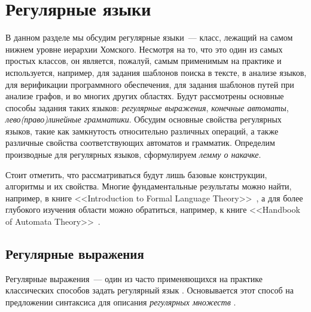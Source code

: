 \setchapterpreamble[u]{\margintoc}
\chapter{Регулярные языки}

В данном разделе мы обсудим регулярные языки~--- класс, лежащий на самом нижнем уровне иерархии Хомского.
Несмотря на то, что это один из самых простых классов, он является, пожалуй, самым применимым на практике и используется, например, для задания шаблонов поиска в тексте, в анализе языков, для верификации программного обеспечения, для задания шаблонов путей при анализе графов, и во многих других областях.
Будут рассмотрены основные способы задания таких языков: \emph{регулярные выражения}, \emph{конечные автоматы}, \emph{лево(право)линейные грамматики}.
Обсудим основные свойства регулярных языков, такие как замкнутость относительно различных операций, а также различные свойства соответствующих автоматов и грамматик.
Определим производные для регулярных языков, сформулируем \emph{лемму о накачке}.

Стоит отметить, что рассматриваться будут лишь базовые конструкции, алгоритмы и их свойства.
Многие фундаментальные результаты можно найти, например, в книге <<Introduction to Formal Language Theory>>~\cite{10.5555/578595}, а для более глубокого изучения области можно обратиться, например, к книге <<Handbook of Automata Theory>>~\cite{DBLP:books/ems/21/P2021}.


\section{Регулярные выражения}

Регулярные выражения~--- один из часто применяющихся на практике классических способов задать регулярный язык%
.
Основывается этот способ на предложении синтаксиса для описания \emph{регулярных множеств}%
.

